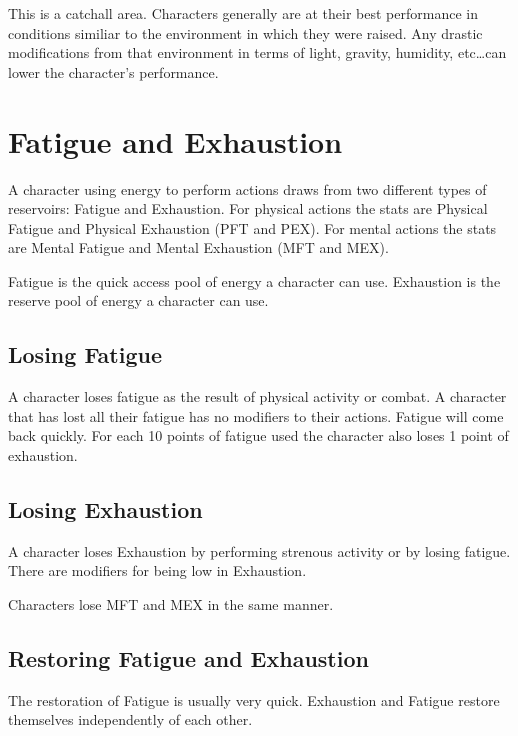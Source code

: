 This is a catchall area. Characters generally are at their best 
performance in conditions similiar to the environment in which they 
were raised. Any drastic modifications from that environment in 
terms of light, gravity, humidity, etc\dots can lower the character's 
performance.



\section{Fatigue and Exhaustion}

A character using energy to perform actions draws from two different 
types of reservoirs: Fatigue and Exhaustion. For physical actions the 
stats are Physical Fatigue and Physical Exhaustion (PFT and PEX). For mental
actions the stats are Mental Fatigue and Mental Exhaustion (MFT and MEX).

Fatigue is the quick access pool of energy a character can use.
Exhaustion is the reserve pool of energy a character can use. 

\subsection{Losing Fatigue}

A character loses fatigue as the result of physical activity or combat. 
A character that has lost all their fatigue has no modifiers to their actions.
Fatigue will come back quickly. For each 10 points of fatigue used the character 
also loses 1 point of exhaustion.

\subsection{Losing Exhaustion}
A character loses Exhaustion by performing strenous activity or by losing 
fatigue. There are modifiers for being low in Exhaustion.



Characters lose MFT and MEX in the same manner.



\subsection{Restoring Fatigue and Exhaustion}

The restoration of Fatigue is usually very quick. Exhaustion and Fatigue
restore themselves independently of each other.

